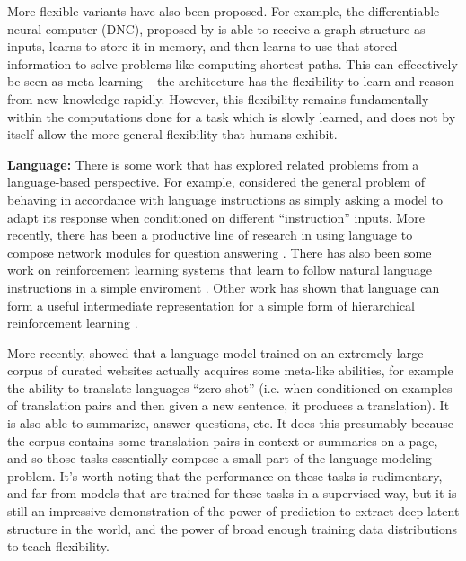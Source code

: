 More flexible variants have also been proposed. For example, the differentiable neural computer (DNC), proposed by \citet{Graves2016} is able to receive a graph structure as inputs, learns to store it in memory, and then learns to use that stored information to solve problems like computing shortest paths. This can effecetively be seen as meta-learning -- the architecture has the flexibility to learn and reason from new knowledge rapidly. However, this flexibility remains fundamentally within the computations done for a task which is slowly learned, and does not by itself allow the more general flexibility that humans exhibit. \par
\textbf{Language:} There is some work that has explored related problems from a language-based perspective. For example, \citet{Larochelle2008} considered the general problem of behaving in accordance with language instructions as simply asking a model to adapt its response when conditioned on different ``instruction'' inputs. More recently, there has been a productive line of research in using language to compose network modules for question answering \citep{Andreas, Andreasa}. There has also been some work on reinforcement learning systems that learn to follow natural language instructions in a simple enviroment \citep{Hermann2017}. Other work has shown that language can form a useful intermediate representation for a simple form of hierarchical reinforcement learning \citep{Jiang2019}. \par
More recently, \citet{Radford2019} showed that a language model trained on an extremely large corpus of curated websites actually acquires some meta-like abilities, for example the ability to translate languages ``zero-shot'' (i.e. when conditioned on examples of translation pairs and then given a new sentence, it produces a translation). It is also able to summarize, answer questions, etc. It does this presumably because the corpus contains some translation pairs in context or summaries on a page, and so those tasks essentially compose a small part of the language modeling problem. It's worth noting that the performance on these tasks is rudimentary, and far from models that are trained for these tasks in a supervised way, but it is still an impressive demonstration of the power of prediction to extract deep latent structure in the world, and the power of broad enough training data distributions to teach flexibility. \par  
